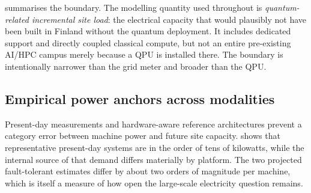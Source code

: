 \documentclass[11pt,a4paper]{article}
\begin{document}
 summarises the boundary. The modelling quantity used throughout is \emph{quantum-related incremental site load}: the electrical capacity that would plausibly not have been built in Finland without the quantum deployment. It includes dedicated support and directly coupled classical compute, but not an entire pre-existing AI/HPC campus merely because a QPU is installed there. The boundary is intentionally narrower than the grid meter and broader than the QPU.

\subsection{Empirical power anchors across modalities}
Present-day measurements and hardware-aware reference architectures prevent a category error between machine power and future site capacity.  shows that representative present-day systems are in the order of tens of kilowatts, while the internal source of that demand differs materially by platform. The two projected fault-tolerant estimates differ by about two orders of magnitude per machine, which is itself a measure of how open the large-scale electricity question remains.
\end{document}
